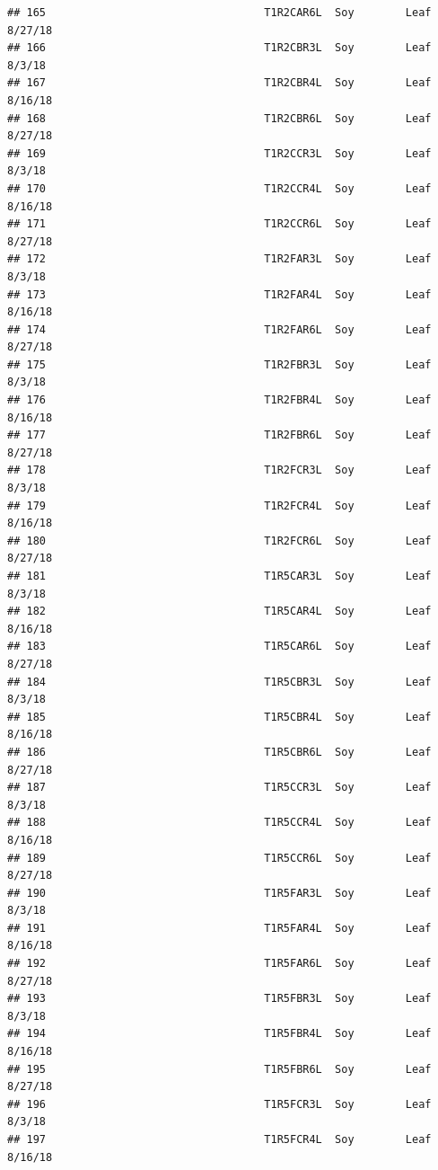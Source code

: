 \documentclass[
]{article}
\begin{document}
\begin{verbatim}
## 165                                  T1R2CAR6L  Soy        Leaf     8/27/18
## 166                                  T1R2CBR3L  Soy        Leaf      8/3/18
## 167                                  T1R2CBR4L  Soy        Leaf     8/16/18
## 168                                  T1R2CBR6L  Soy        Leaf     8/27/18
## 169                                  T1R2CCR3L  Soy        Leaf      8/3/18
## 170                                  T1R2CCR4L  Soy        Leaf     8/16/18
## 171                                  T1R2CCR6L  Soy        Leaf     8/27/18
## 172                                  T1R2FAR3L  Soy        Leaf      8/3/18
## 173                                  T1R2FAR4L  Soy        Leaf     8/16/18
## 174                                  T1R2FAR6L  Soy        Leaf     8/27/18
## 175                                  T1R2FBR3L  Soy        Leaf      8/3/18
## 176                                  T1R2FBR4L  Soy        Leaf     8/16/18
## 177                                  T1R2FBR6L  Soy        Leaf     8/27/18
## 178                                  T1R2FCR3L  Soy        Leaf      8/3/18
## 179                                  T1R2FCR4L  Soy        Leaf     8/16/18
## 180                                  T1R2FCR6L  Soy        Leaf     8/27/18
## 181                                  T1R5CAR3L  Soy        Leaf      8/3/18
## 182                                  T1R5CAR4L  Soy        Leaf     8/16/18
## 183                                  T1R5CAR6L  Soy        Leaf     8/27/18
## 184                                  T1R5CBR3L  Soy        Leaf      8/3/18
## 185                                  T1R5CBR4L  Soy        Leaf     8/16/18
## 186                                  T1R5CBR6L  Soy        Leaf     8/27/18
## 187                                  T1R5CCR3L  Soy        Leaf      8/3/18
## 188                                  T1R5CCR4L  Soy        Leaf     8/16/18
## 189                                  T1R5CCR6L  Soy        Leaf     8/27/18
## 190                                  T1R5FAR3L  Soy        Leaf      8/3/18
## 191                                  T1R5FAR4L  Soy        Leaf     8/16/18
## 192                                  T1R5FAR6L  Soy        Leaf     8/27/18
## 193                                  T1R5FBR3L  Soy        Leaf      8/3/18
## 194                                  T1R5FBR4L  Soy        Leaf     8/16/18
## 195                                  T1R5FBR6L  Soy        Leaf     8/27/18
## 196                                  T1R5FCR3L  Soy        Leaf      8/3/18
## 197                                  T1R5FCR4L  Soy        Leaf     8/16/18

\end{verbatim}
\end{document}
